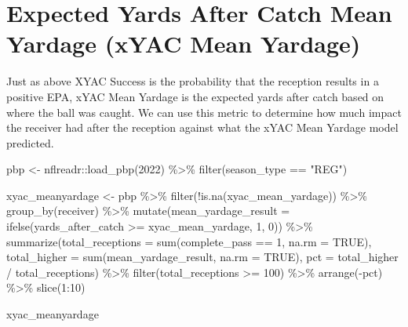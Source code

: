 \documentclass[
  letterpaper,
]{krantz}
\newenvironment{Shaded}{\begin{snugshade}}{\end{snugshade}}
\newcommand{\AttributeTok}[1]{\textcolor[rgb]{0.40,0.45,0.13}{#1}}
\newcommand{\ConstantTok}[1]{\textcolor[rgb]{0.56,0.35,0.01}{#1}}
\newcommand{\DecValTok}[1]{\textcolor[rgb]{0.68,0.00,0.00}{#1}}
\newcommand{\FunctionTok}[1]{\textcolor[rgb]{0.28,0.35,0.67}{#1}}
\newcommand{\NormalTok}[1]{\textcolor[rgb]{0.00,0.23,0.31}{#1}}
\newcommand{\OtherTok}[1]{\textcolor[rgb]{0.00,0.23,0.31}{#1}}
\newcommand{\SpecialCharTok}[1]{\textcolor[rgb]{0.37,0.37,0.37}{#1}}
\newcommand{\StringTok}[1]{\textcolor[rgb]{0.13,0.47,0.30}{#1}}
\begin{document}
\hypertarget{expected-yards-after-catch-mean-yardage-xyac-mean-yardage}{%
\section{Expected Yards After Catch Mean Yardage (xYAC Mean
Yardage)}\label{expected-yards-after-catch-mean-yardage-xyac-mean-yardage}}

Just as above XYAC Success is the probability that the reception results
in a positive EPA, xYAC Mean Yardage is the expected yards after catch
based on where the ball was caught. We can use this metric to determine
how much impact the receiver had after the reception against what the
xYAC Mean Yardage model predicted.

\begin{Shaded}
\begin{Highlighting}[]
\NormalTok{pbp }\OtherTok{\textless{}{-}}\NormalTok{ nflreadr}\SpecialCharTok{::}\FunctionTok{load\_pbp}\NormalTok{(}\DecValTok{2022}\NormalTok{) }\SpecialCharTok{\%\textgreater{}\%}
  \FunctionTok{filter}\NormalTok{(season\_type }\SpecialCharTok{==} \StringTok{"REG"}\NormalTok{)}

\NormalTok{xyac\_meanyardage }\OtherTok{\textless{}{-}}\NormalTok{ pbp }\SpecialCharTok{\%\textgreater{}\%}
  \FunctionTok{filter}\NormalTok{(}\SpecialCharTok{!}\FunctionTok{is.na}\NormalTok{(xyac\_mean\_yardage)) }\SpecialCharTok{\%\textgreater{}\%}
  \FunctionTok{group\_by}\NormalTok{(receiver) }\SpecialCharTok{\%\textgreater{}\%}
  \FunctionTok{mutate}\NormalTok{(}\AttributeTok{mean\_yardage\_result =} \FunctionTok{ifelse}\NormalTok{(yards\_after\_catch }\SpecialCharTok{\textgreater{}=}\NormalTok{ xyac\_mean\_yardage,}
                                      \DecValTok{1}\NormalTok{, }\DecValTok{0}\NormalTok{)) }\SpecialCharTok{\%\textgreater{}\%}
  \FunctionTok{summarize}\NormalTok{(}\AttributeTok{total\_receptions =} \FunctionTok{sum}\NormalTok{(complete\_pass }\SpecialCharTok{==} \DecValTok{1}\NormalTok{,}
                                   \AttributeTok{na.rm =} \ConstantTok{TRUE}\NormalTok{),}
            \AttributeTok{total\_higher =} \FunctionTok{sum}\NormalTok{(mean\_yardage\_result,}
                               \AttributeTok{na.rm =} \ConstantTok{TRUE}\NormalTok{),}
            \AttributeTok{pct =}\NormalTok{ total\_higher }\SpecialCharTok{/}\NormalTok{ total\_receptions) }\SpecialCharTok{\%\textgreater{}\%}
  \FunctionTok{filter}\NormalTok{(total\_receptions }\SpecialCharTok{\textgreater{}=} \DecValTok{100}\NormalTok{) }\SpecialCharTok{\%\textgreater{}\%}
  \FunctionTok{arrange}\NormalTok{(}\SpecialCharTok{{-}}\NormalTok{pct) }\SpecialCharTok{\%\textgreater{}\%}
  \FunctionTok{slice}\NormalTok{(}\DecValTok{1}\SpecialCharTok{:}\DecValTok{10}\NormalTok{)}

\NormalTok{xyac\_meanyardage}
\end{Highlighting}
\end{Shaded}
\end{document}
